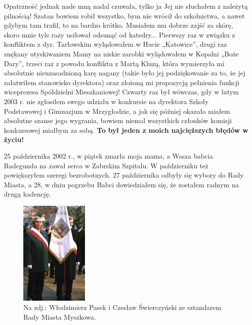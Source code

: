 Opatrzność jednak nade mną nadal czuwała, tylko ja Jej nie słuchałem z należytą pilnością! Szatan bowiem robił wszystko, bym nie wrócił do szkolnictwa, a nawet gdybym tam trafił, to na bardzo krótko. Musiałem mu dobrze zajść za skórę, skoro mnie tyle razy usiłował odsunąć od katedry... Pierwszy raz w związku z konfliktem z dyr. Tarłowskim wylądowałem w Hucie „Katowice”, drugi raz znękany utyskiwaniem Mamy na niskie zarobki wylądowałem w Kopalni „Boże Dary”, trzeci raz z powodu konfliktu z Martą Kluzą, która wymierzyła mi absolutnie nieuzasadnioną karę nagany (takie było jej podziękowanie za to, że jej załatwiłem stanowisko dyrektora) oraz złożoną mi propozycją pełnienia funkcji wiceprezesa Spółdzielni Mieszkaniowej! Czwarty raz był wówczas, gdy w lutym 2003 r. nie zgłosiłem swego udziału w konkursie na dyrektora Szkoły Podstawowej i Gimnazjum w Mrzygłodzie, a jak się później okazało miałem absolutne szanse jego wygrania, bowiem niemal wszystkich członków komisji konkursowej miałbym za sobą. \textbf{To był jeden z moich najcięższych błędów w życiu!}

25 października 2002 r., w piątek zmarła moja mama, a Wasza babcia Radegunda na zawał serca w Zabrskim Szpitalu. W październiku też powiększyłem szeregi bezrobotnych. 27 października odbyły się wybory do Rady Miasta, a 28, w dniu pogrzebu Babci dowiedziałem się, że zostałem radnym na drugą kadencję.
\begin{figure}[!h]
\begin{center}
\includegraphics[width=0.3\textwidth]{photo/czeslaw_swierczynski_ze_sztandarem_rady_miasta.jpg}
\caption[Poczet sztandarowy]{Na zdj.: Włodzimierz Pasek i Czesław Świerczyński ze sztandarem Rady Miasta Myszkowa.}
\end{center}
\end{figure}

